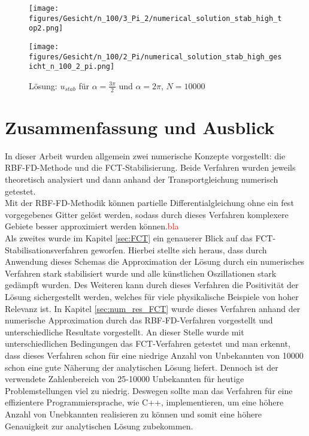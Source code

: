 \documentclass[12pt,titlepage]{article}
\newcommand{\col}[2][red]{\textcolor{#1}{#2}}
\begin{document}
\begin{figure}[H]
\begin{minipage}{0.4\textwidth}
 \texttt{[image: figures/Gesicht/n\_100/3\_Pi\_2/numerical\_solution\_stab\_high\_top2.png]}
\vspace{-0.4cm}
\end{minipage}
\hspace{1.4cm}
\begin{minipage}{0.4\textwidth}
 \texttt{[image: figures/Gesicht/n\_100/2\_Pi/numerical\_solution\_stab\_high\_gesicht\_n\_100\_2\_pi.png]}
\vspace{-0.4cm}
\end{minipage}
\caption{Lösung: $u_{stab}$ für $\alpha=\frac{3\pi}{2}$ und $\alpha=2\pi$, $N=10000$}
\label{fig:gauss_2pi}
\end{figure}
\pagebreak
\section{Zusammenfassung und Ausblick}
In dieser Arbeit wurden allgemein zwei numerische Konzepte vorgestellt: die RBF-FD-Methode und die FCT-Stabilisierung. Beide Verfahren wurden jeweils theoretisch analysiert und dann anhand der Transportgleichung numerisch getestet.\\
Mit der RBF-FD-Methodik können partielle Differentialgleichung ohne ein fest vorgegebenes Gitter gelöst werden, sodass durch dieses Verfahren komplexere Gebiete besser approximiert werden können.\col{bla}\\
Als zweites wurde im Kapitel \ref{sec:FCT} ein genauerer Blick auf das FCT-Stabilisationsverfahren geworfen. Hierbei stellte sich heraus, dass durch Anwendung dieses Schemas die Approximation der Lösung durch ein numerisches Verfahren stark stabilisiert wurde und alle künstlichen Oszillationen stark gedämpft wurden. Des Weiteren kann durch dieses Verfahren die Positivität der Lösung sichergestellt werden, welches für viele physikalische Beispiele von hoher Relevanz ist. In Kapitel \ref{sec:num_res_FCT} wurde dieses Verfahren anhand der numerische Approximation durch das RBF-FD-Verfahren vorgestellt und unterschiedliche Resultate vorgestellt. An dieser Stelle wurde mit unterschiedlichen Bedingungen das FCT-Verfahren getestet und man erkennt, dass dieses Verfahren schon für eine niedrige Anzahl von Unbekannten von 10000 schon eine gute Näherung der analytischen Lösung liefert. Dennoch ist der verwendete Zahlenbereich von 25-10000 Unbekannten für heutige Problemstellungen viel zu niedrig. Deswegen  sollte man das Verfahren für eine effizientere Programmiersprache, wie C++, implementieren, um eine höhere Anzahl von Unebkannten realisieren zu können und somit eine höhere Genauigkeit zur analytischen Lösung zubekommen.
\newpage
{}
\setcounter{page}{3}
\appendix


\end{document}
